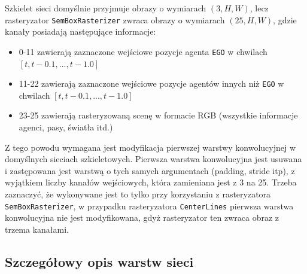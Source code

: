 \noindent
Szkielet sieci domyślnie przyjmuje obrazy o wymiarach $(3, H, W)$, lecz rasteryzator \texttt{SemBoxRasterizer} zwraca obrazy o wymiarach $(25, H, W)$, gdzie kanały posiadają następujące informacje:

\begin{itemize}
    \setlength{\itemsep}{1pt}
    \setlength{\parskip}{0pt}
    \setlength{\parsep}{0pt}
    \item 0-11 zawierają zaznaczone wejściowe pozycje agenta \texttt{EGO} w chwilach \mbox{$[t, t-0.1, ... , t-1.0]$}
    \item 11-22 zawierają zaznaczone wejściowe pozycje agentów innych niż \texttt{EGO} w chwilach \mbox{$[t, t-0.1, ... , t-1.0]$}
    \item 23-25 zawierają rasteryzowaną scenę w formacie RGB (wszystkie informacje agenci, pasy, światła itd.)
\end{itemize}

Z tego powodu wymagana jest modyfikacja pierwszej warstwy konwolucyjnej w domyślnych sieciach szkieletowych. Pierwsza warstwa konwolucyjna jest usuwana i zastępowana jest warstwą o tych samych argumentach (padding, stride itp), z wyjątkiem liczby kanałów wejściowych, która zamieniana jest z 3 na 25. Trzeba zaznaczyć, że wykonywane jest to tylko przy korzystaniu z rasteryzatora \texttt{SemBoxRasterizer}, w przypadku rasteryzatora \texttt{CenterLines} pierwsza warstwa konwolucyjna nie jest modyfikowana, gdyż rasteryzator ten zwraca obraz z trzema kanałami.

\newpage

\subsection{Szczegółowy opis warstw sieci}

